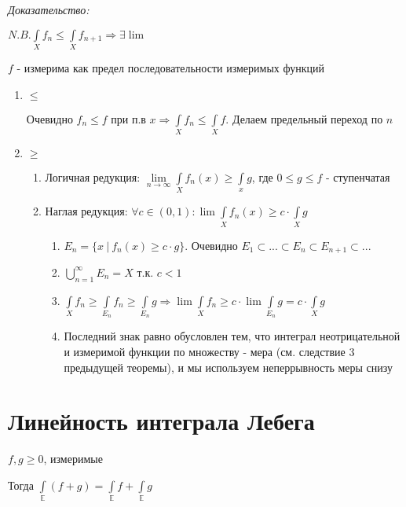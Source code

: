 \documentclass[paper=a4, fontsize=13.2pt]{article}
\begin{document}
\emph{Доказательство:}

$N.B. \int\limits_{X}f_n \leqslant \int\limits_{X}f_{n+1} \Rightarrow \exists \lim$

$f$ - измерима как предел последовательности измеримых функций

\begin{enumerate}
	\item $\leqslant$

	Очевидно $f_n \leqslant f$ при п.в $x \Rightarrow \int\limits_{X}f_n \leqslant \int\limits_{X}f$. Делаем предельный переход по $n$

	\item $\geqslant$
		\begin{enumerate}
			\item Логичная редукция: $\lim\limits_{n \rightarrow \infty} \int\limits_{X}f_n(x) \geqslant \int\limits_{x}g$, где $0 \leqslant g \leqslant f$ - ступенчатая

			\item Наглая редукция: $\forall c \in (0,1): \lim\int\limits_{X}f_n(x) \geqslant c \cdot \int\limits_{X}g$
				\begin{enumerate}
					\item $E_n = \{x\ |\ f_n(x) \geqslant c \cdot g\}$. Очевидно $E_1 \subset ... \subset E_n \subset E_{n + 1} \subset ...$

					\item $\bigcup\limits_{n=1}^{\infty}E_n = X$ т.к. $c < 1$

					\item $\int\limits_{X}f_n \geqslant \int\limits_{E_n}f_n \geqslant \int\limits_{E_n}g \Rightarrow \lim \int\limits_{X}f_n \geqslant c \cdot \lim \int\limits_{E_n}g = c \cdot \int\limits_{X}g$

					\item Последний знак равно обусловлен тем, что интеграл неотрицательной и измеримой функции по множеству - мера (см. следствие 3 предыдущей теоремы), и мы используем неперрывность меры снизу
				\end{enumerate}
		\end{enumerate}
\end{enumerate}

\section{Линейность интеграла Лебега}

$f, g \geqslant 0$, измеримые

Тогда $\int\limits_{\mathds{E}} (f + g) = \int\limits_{\mathds{E}} f + \int\limits_{\mathds{E}} g$
\end{document}

